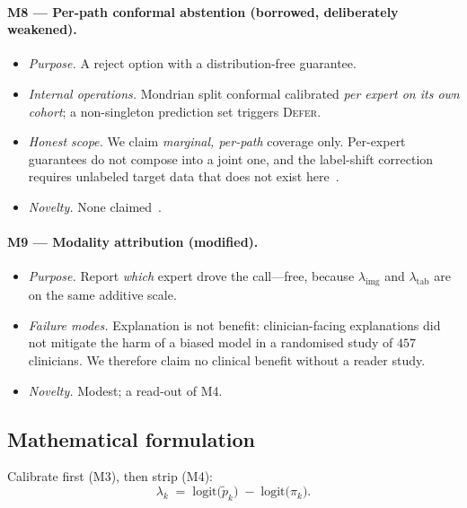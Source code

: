 \documentclass[sigplan,nonacm,screen]{acmart}
\begin{document}
\paragraph{M8 --- Per-path conformal abstention (borrowed, deliberately weakened).}
\begin{itemize}
  \item \emph{Purpose.} A reject option with a distribution-free guarantee.
  \item \emph{Internal operations.} Mondrian split conformal calibrated \emph{per expert on its own cohort}; a non-singleton prediction set triggers \textsc{Defer}.
  \item \emph{Honest scope.} We claim \emph{marginal, per-path} coverage only. Per-expert guarantees do not compose into a joint one, and the label-shift correction requires unlabeled target data that does not exist here~\cite{podkopaev2021distribution}.
  \item \emph{Novelty.} None claimed~\cite{angelopoulos2021gentle}.
\end{itemize}

\paragraph{M9 --- Modality attribution (modified).}
\begin{itemize}
  \item \emph{Purpose.} Report \emph{which} expert drove the call---free, because $\lambda_{\mathrm{img}}$ and $\lambda_{\mathrm{tab}}$ are on the same additive scale.
  \item \emph{Failure modes.} Explanation is not benefit: clinician-facing explanations did not mitigate the harm of a biased model in a randomised study of $457$ clinicians. We therefore claim no clinical benefit without a reader study.
  \item \emph{Novelty.} Modest; a read-out of M4.
\end{itemize}

\subsection{Mathematical formulation}

Calibrate first (M3), then strip (M4):
\begin{equation}
\lambda_k \;=\; \mathrm{logit}\big(\tilde p_k\big) \;-\; \mathrm{logit}\big(\pi_k\big).
\label{eq:strip}
\end{equation}
\end{document}
